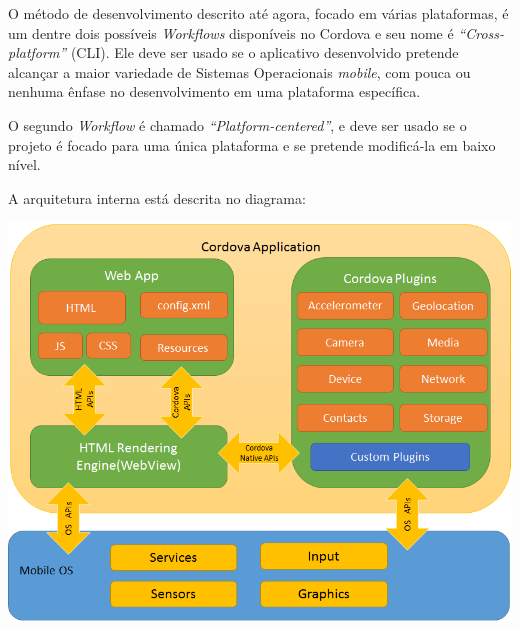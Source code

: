 \documentclass[a4paper,12pt]{article}
\begin{document}
O método de desenvolvimento descrito até agora, focado em várias plataformas, é um dentre dois possíveis \emph{Workflows} disponíveis no Cordova e seu nome é \emph{“Cross-platform”} (CLI). Ele deve ser usado se o aplicativo desenvolvido pretende alcançar a maior variedade de Sistemas Operacionais \emph{mobile}, com pouca ou nenhuma ênfase no desenvolvimento em uma plataforma específica.

O segundo \emph{Workflow} é chamado \emph{“Platform-centered”}, e deve ser usado se o projeto é focado para uma única plataforma e se pretende modificá-la em baixo nível.

A arquitetura interna está descrita no diagrama:

\includegraphics[width=1\linewidth]{images/cordovaapparchitecture.png}






\end{document}
